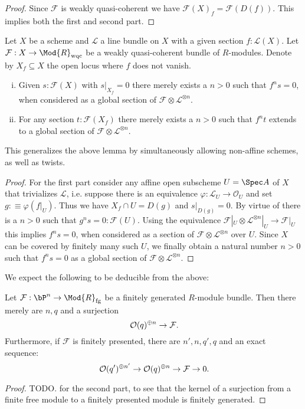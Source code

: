 \begin{proof}
  Since $\mathcal F$ is weakly quasi-coherent we have $\mathcal F (X)_f = \mathcal F (D(f))$.
  This implies both the first and second part.
\end{proof}


\begin{lemma}
  \label{affine-extension-of-sections}
  Let $X$ be a scheme and $\mathcal L$ a line bundle on $X$ with a given section $f:\mathcal L(X)$.
  Let $\mathcal F:X\to \Mod{R}_{\mathrm{wqc}}$ be a weakly quasi-coherent bundle of $R$-modules.
  Denote by $X_f \subseteq X$ the open locus where $f$ does not vanish.
  \begin{enumerate}[(i)]
    \item Given $s:\mathcal F(X)$ with $s|_{X_f} = 0$ there merely exists a $n>0$ such that $f^ns=0$,
      when considered as a global section of $\mathcal F \otimes \mathcal L^{\otimes n}$.
    \item For any section $t:\mathcal F (X_f)$ there merely exists a $n>0$
      such that $f^nt$ extends to a global section of $\mathcal F \otimes \mathcal L^{\otimes n}$.
  \end{enumerate}
\end{lemma}

This generalizes the above lemma by simultaneously allowing non-affine schemes, as well as twists.

\begin{proof}
  For the first part consider any affine open subscheme $U=\Spec A$ of $X$ that trivializes $\mathcal L$,
  i.e. suppose there is an equivalence  $\varphi:\mathcal L_U \to \mathcal O_U$ and set $g :\equiv \varphi(f|_U)$.
  Thus we have $X_f\cap U = D(g)$ and $s|_{D(g)}=0$.
  By virtue of  there is a $n>0$ such that $g^ns=0: \mathcal F(U)$.
  Using the equivalence $\mathcal F|_U\otimes\mathcal L^{\otimes n}|_U \to \mathcal F|_U$ this implies $f^ns=0$,
  when considered as a section of $\mathcal F\otimes\mathcal L^{\otimes n}$ over $U$.
  Since $X$ can be covered by finitely many such $U$, we finally obtain a natural number $n>0$ such that $f^ns=0$ as a global section of $\mathcal F\otimes\mathcal L^{\otimes n}$.

\end{proof}

We expect the following to be deducible from the above:

\begin{lemma}
  \label{fp-module-bundle-globally-generated}
  Let $\mathcal F:\bP^n \to \Mod{R}_{\mathrm{fg}}$ be a finitely generated $R$-module bundle.
  Then there merely are $n,q$ and a surjection
  \[ \mathcal O(q)^{\oplus n}\to \mathcal F\rlap{.}\]
  Furthermore, if $\mathcal F$ is finitely presented, there are $n',n,q',q$ and an exact sequence:
  \[ \mathcal O(q')^{\oplus n'}\to \mathcal O(q)^{\oplus n}\to \mathcal F\to 0\rlap{.}\]
\end{lemma}

\begin{proof}
TODO.
\cite[Chapter IV, 1.0 Lemma]{lombardi-quitte} for the second part, to see that the kernel of a surjection from a finite free module to a finitely presented module is finitely generated.
\end{proof}
